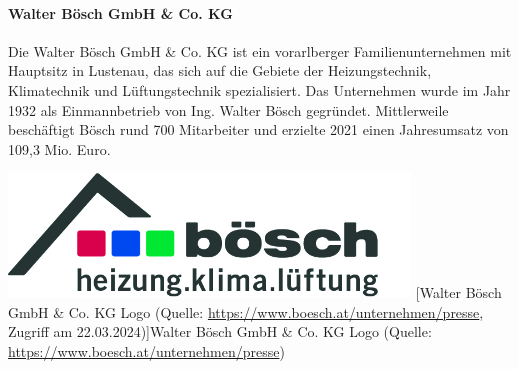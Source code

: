 
\paragraph{Walter Bösch GmbH \& Co. KG}
\vspace{1ex}
\begin{minipage}{0.6\textwidth}
Die Walter Bösch GmbH \& Co. KG ist ein vorarlberger Familienunternehmen mit Hauptsitz in Lustenau, das sich auf die Gebiete der Heizungstechnik, Klimatechnik und Lüftungstechnik spezialisiert. Das Unternehmen wurde im Jahr 1932 als Einmannbetrieb von Ing. Walter Bösch gegründet. Mittlerweile beschäftigt Bösch rund 700 Mitarbeiter und erzielte 2021 einen Jahresumsatz von 109,3 Mio. Euro. \cite[vgl.][]{walter_boesch:o.J.}
\end{minipage}%
\hfill
\begin{minipage}{0.37\textwidth}
	\centering	
	\includegraphics[width=0.8\textwidth]{boesch_logo_original}
	[Walter Bösch GmbH \& Co. KG Logo (Quelle: \url{https://www.boesch.at/unternehmen/presse}, Zugriff am 22.03.2024)]{Walter Bösch GmbH \& Co. KG Logo (Quelle: \url{https://www.boesch.at/unternehmen/presse}) \label{fig:boesch_logo}}
\end{minipage}

